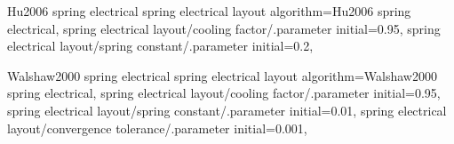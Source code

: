 %
% 
%
\pgfgddeclarealgorithmkey
  {Hu2006 spring electrical}
  {spring electrical layout}
  {
    algorithm=Hu2006 spring electrical,
    spring electrical layout/cooling factor/.parameter initial=0.95,
    spring electrical layout/spring constant/.parameter initial=0.2,
  }



%
%
%
\pgfgddeclarealgorithmkey
  {Walshaw2000 spring electrical}
  {spring electrical layout}
  {
    algorithm=Walshaw2000 spring electrical,
    spring electrical layout/cooling factor/.parameter initial=0.95,
    spring electrical layout/spring constant/.parameter initial=0.01,
    spring electrical layout/convergence tolerance/.parameter initial=0.001,
  }
